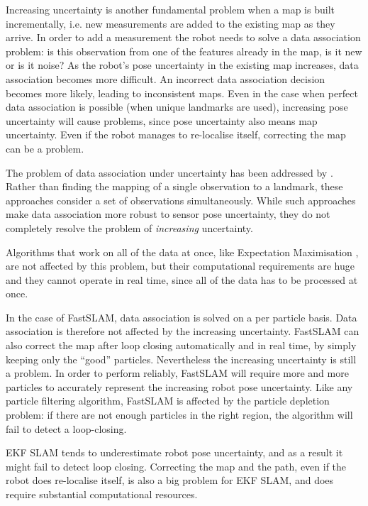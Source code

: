 Increasing uncertainty is another fundamental problem when a map is
built incrementally, i.e. new measurements are added to the existing
map as they arrive. In order to add a measurement the robot needs to
solve a data association problem: is this observation from one of the
features already in the map, is it new or is it noise?  As the robot's
pose uncertainty in the existing map increases, data association
becomes more difficult. An incorrect data association decision becomes
more likely, leading to inconsistent maps. Even in the case when
perfect data association is possible (when unique landmarks are used),
increasing pose uncertainty will cause problems, since pose
uncertainty also means map uncertainty. Even if the robot manages to
re-localise itself, correcting the map can be a problem.

The problem of data association under uncertainty has been addressed
by \cite{neira01:_data_assoc_stoch_mappin_using,
  tardos02:_mappin_local_indoor_envir_using_sonar_data}.  Rather than
finding the mapping of a single observation to a landmark, these
approaches consider a set of observations simultaneously. While such
approaches make data association more robust to sensor pose
uncertainty, they do not completely resolve the problem of {\it
  increasing} uncertainty.


Algorithms that work on all of the data at once, like Expectation
Maximisation \cite{thrun98:_probab}, are not affected by this problem,
but their computational requirements are huge and they cannot operate
in real time, since all of the data has to be processed at once.

In the case of FastSLAM, data association is solved on a per particle
basis. Data association is therefore not affected by the increasing
uncertainty. FastSLAM can also correct the map after loop closing
automatically and in real time, by simply keeping only the ``good''
particles. Nevertheless the increasing uncertainty is still a
problem. In order to perform reliably, FastSLAM will require more and
more particles to accurately represent the increasing robot pose
uncertainty. Like any particle filtering algorithm, FastSLAM is
affected by the particle depletion problem: if there are not enough
particles in the right region, the algorithm will fail to detect a
loop-closing.

EKF SLAM tends to underestimate robot pose uncertainty, and as a
result it might fail to detect loop closing. Correcting the map and
the path, even if the robot does re-localise itself, is also a big
problem for EKF SLAM, and does require substantial computational
resources.


